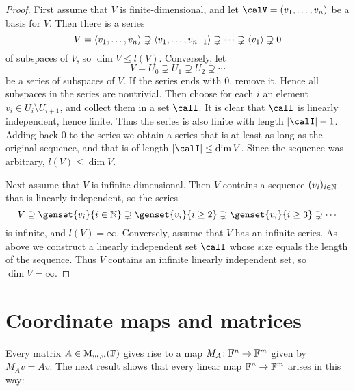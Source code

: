 \begin{proof}
    First assume that $V$ is finite-dimensional, and let $\calV = (v_1, \ldots, v_n)$ be a basis for $V$. Then there is a series
    \begin{equation*}
        V
            = \langle v_1, \ldots, v_n\rangle
            \supsetneq \langle v_1, \ldots, v_{n-1}\rangle
            \supsetneq \cdots
            \supsetneq \langle v_1\rangle
            \supsetneq 0
    \end{equation*}
    of subspaces of $V$, so $\dim V \leq l(V)$. Conversely, let
    \begin{equation*}
        V
            = U_0
            \supsetneq U_1
            \supsetneq U_2
            \supsetneq \cdots
    \end{equation*}
    be a series of subspaces of $V$. If the series ends with $0$, remove it. Hence all subspaces in the series are nontrivial. Then choose for each $i$ an element $v_i \in U_i \setminus U_{i+1}$, and collect them in a set $\calI$. It is clear that $\calI$ is linearly independent, hence finite. Thus the series is also finite with length $\card{\calI}-1$. Adding back $0$ to the series we obtain a series that is at least as long as the original sequence, and that is of length $\card{\calI} \leq \dim V$. Since the sequence was arbitrary, $l(V) \leq \dim V$.

    Next assume that $V$ is infinite-dimensional. Then $V$ contains a sequence $(v_i)_{i\in\mathbb{N}}$ that is linearly independent, so the series
    \begin{equation*}
        V
            \supseteq \genset{v_i}{i \in \naturals}
            \supsetneq \genset{v_i}{i \geq 2}
            \supsetneq \genset{v_i}{i \geq 3}
            \supsetneq \cdots
    \end{equation*}
    is infinite, and $l(V) = \infty$. Conversely, assume that $V$ has an infinite series. As above we construct a linearly independent set $\calI$ whose size equals the length of the sequence. Thus $V$ contains an infinite linearly independent set, so $\dim V = \infty$.
\end{proof}


\section{Coordinate maps and matrices}

Every matrix $A \in \mathrm{M}_{m,n}(\mathbb{F})$ gives rise to a map $M_A \colon \mathbb{F}^n \to \mathbb{F}^m$ given by $M_A v = Av$. The next result shows that every linear map $\mathbb{F}^n \to \mathbb{F}^m$ arises in this way:

